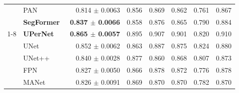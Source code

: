 \begin{table}
\begin{tabular}{llrrrrrr}
		                         & PAN~\cite{DBLP:journals/corr/abs-1805-10180}              & 0.814 $\pm$ 0.0063                                 & 0.856                                  & 0.869                               & 0.862                                 & 0.761                               & 0.867                               \\
		                         & \textbf{SegFormer}~\cite{xie2021segformer}                & \textbf{0.837 $\pm$ 0.0066}                        & 0.858                                  & 0.876                               & 0.865                                 & 0.790                               & 0.884                               \\
		\cmidrule{1-8}
		\multirow{8}{*}{SS-JEPA} & \textbf{UPerNet}~\cite{DBLP:journals/corr/abs-1807-10221} & \textbf{0.865 $\pm$ 0.0057}                        & 0.895                                  & 0.907                               & 0.901                                 & 0.820                               & 0.910                               \\
		                         & UNet~\cite{ronneberger2015unet}                           & 0.852 $\pm$ 0.0062                                 & 0.863                                  & 0.887                               & 0.875                                 & 0.824                               & 0.880                               \\
		                         & UNet++~\cite{zhou2019unetplusplus}                        & 0.840 $\pm$ 0.0028                                 & 0.877                                  & 0.860                               & 0.868                                 & 0.807                               & 0.873                               \\
		                         & FPN~\cite{DBLP:journals/corr/LinDGHHB16}                  & 0.827 $\pm$ 0.0050                                 & 0.866                                  & 0.878                               & 0.872                                 & 0.776                               & 0.878                               \\
		                         & MANet~\cite{Li_2022}                                      & 0.826 $\pm$ 0.0091                                 & 0.869                                  & 0.870                               & 0.870                                 & 0.782                               & 0.870                               \\

\end{tabular}
\end{table}
